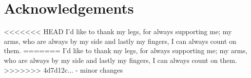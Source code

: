 \chapter*{Acknowledgements}
<<<<<<< HEAD
I'd like to thank my legs, for always supporting me; my arms, who are always by my side and lastly my fingers, I can always count on them.
=======
I'd like to thank my legs, for always supporting me; my arms, who are always by my side and lastly my fingers, I can always count on them.
>>>>>>> 4d7d12c... - minor changes
